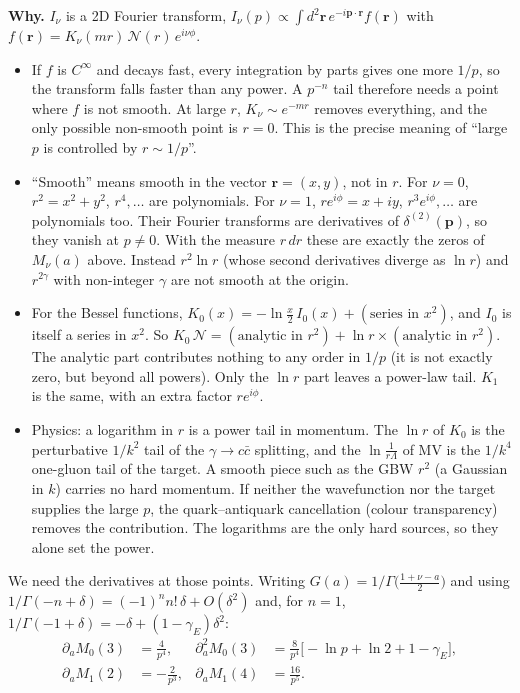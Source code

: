 \documentclass[12pt]{article}
\begin{document}
\textbf{Why.} $I_\nu$ is a 2D Fourier transform,
$I_\nu(p)\propto\int d^2\mathbf r\,e^{-i\mathbf p\cdot\mathbf r}f(\mathbf r)$ with
$f(\mathbf r)=K_\nu(mr)\,\mathcal N(r)\,e^{i\nu\phi}$.
\begin{itemize}
\item If $f$ is $C^\infty$ and decays fast, every integration by parts gives one more $1/p$, so the
transform falls faster than any power. A $p^{-n}$ tail therefore needs a point where $f$ is not smooth.
At large $r$, $K_\nu\sim e^{-mr}$ removes everything, and the only possible non-smooth point is $r=0$.
This is the precise meaning of ``large $p$ is controlled by $r\sim1/p$''.
\item ``Smooth'' means smooth in the vector $\mathbf r=(x,y)$, not in $r$. For $\nu=0$,
$r^2=x^2+y^2$, $r^4,\dots$ are polynomials. For $\nu=1$, $re^{i\phi}=x+iy$, $r^3e^{i\phi},\dots$ are
polynomials too. Their Fourier transforms are derivatives of $\delta^{(2)}(\mathbf p)$, so they vanish
at $p\neq0$. With the measure $r\,dr$ these are exactly the zeros of $M_\nu(a)$ above. Instead
$r^2\ln r$ (whose second derivatives diverge as $\ln r$) and $r^{2\gamma}$ with non-integer $\gamma$
are not smooth at the origin.
\item For the Bessel functions, $K_0(x)=-\ln\frac x2\,I_0(x)+(\text{series in }x^2)$, and $I_0$ is
itself a series in $x^2$. So $K_0\,\mathcal N=(\text{analytic in }r^2)+\ln r\times(\text{analytic in }r^2)$.
The analytic part contributes nothing to any order in $1/p$ (it is not exactly zero, but beyond all powers).
Only the $\ln r$ part leaves a power-law tail. $K_1$ is the same, with an extra factor $re^{i\phi}$.
\item Physics: a logarithm in $r$ is a power tail in momentum. The $\ln r$ of $K_0$ is the
perturbative $1/k^2$ tail of the $\gamma\to c\bar c$ splitting, and the $\ln\frac1{r\Lambda}$ of MV
is the $1/k^4$ one-gluon tail of the target. A smooth piece such as the GBW $r^2$ (a Gaussian in $k$)
carries no hard momentum. If neither the wavefunction nor the target supplies the large $p$, the
quark--antiquark cancellation (colour transparency) removes the contribution. The logarithms are the
only hard sources, so they alone set the power.
\end{itemize}

We need the derivatives at those points. Writing $G(a)=1/\Gamma\big(\tfrac{1+\nu-a}{2}\big)$ and using
$1/\Gamma(-n+\delta)=(-1)^n n!\,\delta+O(\delta^2)$ and, for $n=1$,
$1/\Gamma(-1+\delta)=-\delta+(1-\gamma_E)\delta^2$:
\begin{align*}
  \partial_aM_0(3)&=\frac{4}{p^4}, &
  \partial_a^2M_0(3)&=\frac{8}{p^4}\Big[-\ln p+\ln2+1-\gamma_E\Big],\\
  \partial_aM_1(2)&=-\frac{2}{p^3}, &
  \partial_aM_1(4)&=\frac{16}{p^5}.
\end{align*}
\end{document}
